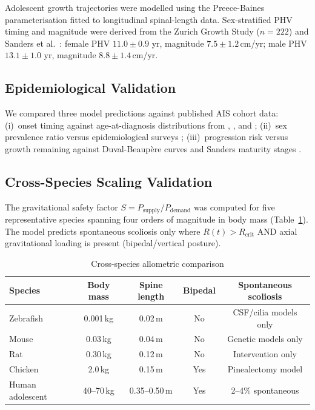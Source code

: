 \documentclass[12pt, letterpaper]{article}
\begin{document}
Adolescent growth trajectories were modelled using the Preece-Baines
parameterisation fitted to longitudinal spinal-length data. Sex-stratified PHV
timing and magnitude were derived from the Zurich Growth Study ($n=222$)
\citep{Tanner1966} and Sanders et al.\ \citep{Sanders2007}:
female PHV $11.0\pm0.9$ yr, magnitude $7.5\pm1.2$\,cm/yr;
male PHV $13.1\pm1.0$ yr, magnitude $8.8\pm1.4$\,cm/yr.

\subsection{Epidemiological Validation}

We compared three model predictions against published AIS cohort data:
(i)~onset timing against age-at-diagnosis distributions from
\citet{Lonstein1982}, \citet{Weinstein2008}, and \citet{Suh2011};
(ii)~sex prevalence ratio versus epidemiological surveys
\citep{Weinstein2008, ChengNRDP2015};
(iii)~progression risk versus growth remaining against Duval-Beaup\`{e}re
curves \citep{DuvalBeaupere1992} and Sanders maturity stages \citep{Sanders2007}.

\subsection{Cross-Species Scaling Validation}

The gravitational safety factor $S = P_{\mathrm{supply}}/P_{\mathrm{demand}}$
was computed for five representative species spanning four orders of magnitude in
body mass (Table~\ref{tab:species}). The model predicts spontaneous scoliosis
only where $R(t) > R_{\mathrm{crit}}$ AND axial gravitational loading is present
(bipedal/vertical posture).

\begin{table}[H]
  \centering
  \caption{Cross-species allometric comparison}
  \label{tab:species}
  \renewcommand{\arraystretch}{1.3}
  \begin{tabular}{lcccc}
    \toprule
    Species & Body mass & Spine length & Bipedal & Spontaneous scoliosis \\
    \midrule
    Zebrafish & 0.001\,kg & 0.02\,m & No & CSF/cilia models only \\
    Mouse & 0.03\,kg & 0.04\,m & No & Genetic models only \\
    Rat & 0.30\,kg & 0.12\,m & No & Intervention only \\
    Chicken & 2.0\,kg & 0.15\,m & Yes & Pinealectomy model \\
    Human adolescent & 40--70\,kg & 0.35--0.50\,m & Yes & 2--4\% spontaneous \\
    \bottomrule
  \end{tabular}
\end{table}
\end{document}
